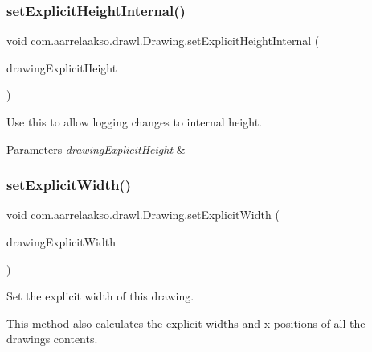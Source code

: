 \subsubsection{\texorpdfstring{set\+Explicit\+Height\+Internal()}{setExplicitHeightInternal()}}
{\footnotesize\ttfamily void com.\+aarrelaakso.\+drawl.\+Drawing.\+set\+Explicit\+Height\+Internal (\begin{DoxyParamCaption}\item[{@Not\+Null \hyperlink{classcom_1_1aarrelaakso_1_1drawl_1_1_drawl_number}{Drawl\+Number}}]{drawing\+Explicit\+Height }\end{DoxyParamCaption})\hspace{0.3cm}{\ttfamily [private]}}



Use this to allow logging changes to internal height. 


\begin{DoxyParams}{Parameters}
{\em drawing\+Explicit\+Height} & \\
\hline
\end{DoxyParams}
\mbox{\label{classcom_1_1aarrelaakso_1_1drawl_1_1_drawing_a6a7382cbb8f41b7b6b465f83f430d56a}} 
\subsubsection{\texorpdfstring{set\+Explicit\+Width()}{setExplicitWidth()}\hspace{0.1cm}{\footnotesize\ttfamily [1/3]}}
{\footnotesize\ttfamily void com.\+aarrelaakso.\+drawl.\+Drawing.\+set\+Explicit\+Width (\begin{DoxyParamCaption}\item[{@Not\+Null \hyperlink{classcom_1_1aarrelaakso_1_1drawl_1_1_drawl_number}{Drawl\+Number}}]{drawing\+Explicit\+Width }\end{DoxyParamCaption})\hspace{0.3cm}{\ttfamily [private]}}



Set the explicit width of this drawing. 

This method also calculates the explicit widths and x positions of all the drawing\textquotesingle{}s contents.


